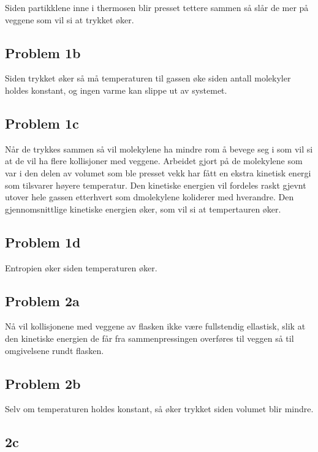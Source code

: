 \documentclass[ reprint, amsmath,amssymb, aps]{revtex4-2}
\begin{document}
Siden partikklene inne i thermosen blir presset tettere sammen så slår de mer på veggene som vil si at trykket øker.

\subsection*{Problem 1b}

Siden trykket øker så må temperaturen til gassen øke siden antall molekyler holdes konstant, og ingen varme kan slippe ut av systemet.

\subsection*{Problem 1c}

Når de trykkes sammen så vil molekylene ha mindre rom å bevege seg i som vil si at de vil ha flere kollisjoner med veggene. Arbeidet gjort på de  molekylene som var i den delen av volumet som ble presset vekk har fått en ekstra kinetisk energi som tilsvarer høyere temperatur. Den kinetiske energien vil fordeles raskt gjevnt utover hele gassen etterhvert som dmolekylene koliderer med hverandre. Den gjennomsnittlige kinetiske energien øker, som vil si at tempertauren øker.

\subsection*{Problem 1d}

Entropien øker siden temperaturen øker.

\subsection*{Problem 2a}

Nå vil kollisjonene med veggene av flasken ikke være fullstendig ellastisk, slik at den kinetiske energien de får fra sammenpressingen overføres til veggen så til omgivelsene rundt flasken. 

\subsection*{Problem 2b}

Selv om temperaturen holdes konstant, så øker trykket siden volumet blir mindre. 

\subsection*{2c}
\end{document}
